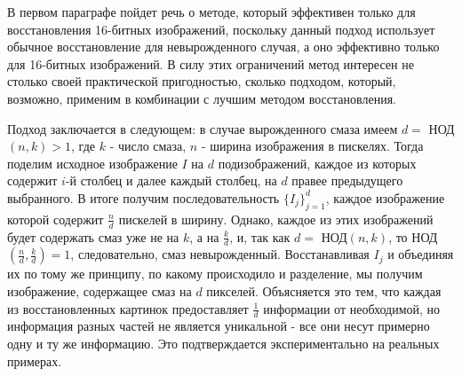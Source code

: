 \documentclass[a4paper]{article}
\theoremstyle{definition}
\begin{document}
    В первом параграфе пойдет речь о методе, который эффективен только для восстановления 16-битных изображений, поскольку данный подход использует обычное восстановление для невырожденного случая, а оно эффективно только для 16-битных изображений. В силу этих ограничений метод интересен не столько своей практической пригодностью, сколько подходом, который, возможно, применим в комбинации с лучшим методом восстановления.


    Подход заключается в следующем: в случае вырожденного смаза имеем $d =$ НОД$(n, k) > 1$, где $k$ - число смаза, $n$ - ширина изображения в пискелях. Тогда поделим исходное изображение $I$ на $d$ подизображений, каждое из которых содержит $i$-й столбец и далее каждый столбец, на $d$ правее предыдущего выбранного. В итоге получим последовательность $\{I_j\}_{j=1}^{d}$, каждое изображение которой содержит $\frac{n}{d}$ пискелей в ширину. Однако, каждое из этих изображений будет содержать смаз уже не на $k$, а на $\frac{k}{d}$, и, так как $d =$ НОД$(n, k)$, то НОД$(\frac{n}{d}, \frac{k}{d}) = 1$, следовательно, смаз невырожденный. Восстанавливая $I_j$ и объединяя их по тому же принципу, по какому происходило и разделение, мы получим изображение, содержащее смаз на $d$ пикселей. Объясняется это тем, что каждая из восстановленных картинок предоставляет $\frac{1}{d}$ информации от необходимой, но информация разных частей не является уникальной - все они несут примерно одну и ту же информацию. Это подтверждается экспериментально на реальных примерах.
\end{document}
